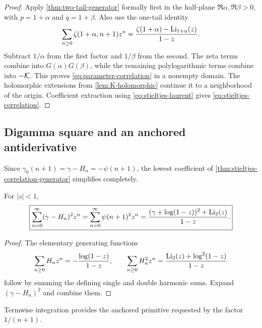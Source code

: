 \begin{proof}
Apply \cref{thm:two-tail-generator} formally first in the half-plane
$\Re\alpha,\Re\beta>0$, with $p=1+\alpha$ and $q=1+\beta$.  Also use
the one-tail identity
\[
 \sum_{n\ge0}\zeta(1+\alpha,n+1)z^n
 =\frac{\zeta(1+\alpha)-\operatorname{Li}_{1+\alpha}(z)}{1-z}.
\]
Subtract $1/\alpha$ from the first factor and $1/\beta$ from the
second.  The zeta terms combine into $G(\alpha)G(\beta)$, while the
remaining polylogarithmic terms combine into $-\mathcal{K}$.  This proves
\eqref{eq:parameter-correlation} in a nonempty domain.  The holomorphic
extensions from \cref{lem:K-holomorphic} continue it to a neighborhood
of the origin.  Coefficient extraction using
\eqref{eq:stieltjes-laurent} gives
\eqref{eq:stieltjes-correlation}.
\end{proof}

\subsection{Digamma square and an anchored antiderivative}

Since $\gamma_0(n+1)=\gamma-H_n=-\psi(n+1)$, the lowest coefficient of
\cref{thm:stieltjes-correlation-generator} simplifies completely.

\begin{corollary}
\label{cor:digamma-square}
For $|z|<1$,
\begin{equation}
 \boxed{\displaystyle
 \sum_{n=0}^{\infty}(\gamma-H_n)^2z^n
 =\sum_{n=0}^{\infty}\psi(n+1)^2z^n
 =\frac{(\gamma+\log(1-z))^2+\operatorname{Li}_2(z)}{1-z}.}
 \label{eq:digamma-square}
\end{equation}
\end{corollary}

\begin{proof}
The elementary generating functions
\[
 \sum_{n\ge0}H_nz^n=-\frac{\log(1-z)}{1-z},
 \qquad
 \sum_{n\ge0}H_n^2z^n
 =\frac{\operatorname{Li}_2(z)+\log^2(1-z)}{1-z}
\]
follow by summing the defining single and double harmonic sums.  Expand
$(\gamma-H_n)^2$ and combine them.
\end{proof}

Termwise integration provides the anchored primitive requested by the
factor $1/(n+1)$.

